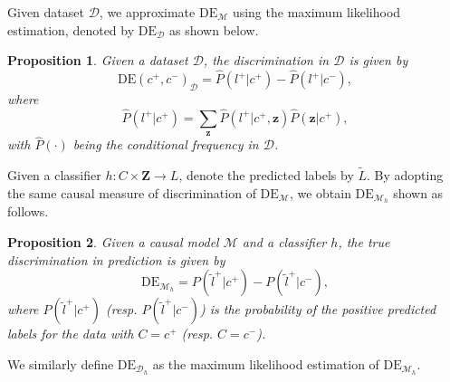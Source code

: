 \documentclass{article}
\newtheorem{proposition}{Proposition}
\begin{document}
Given dataset $\mathcal{D}$, we approximate $\mathrm{DE}_{\mathcal{M}}$ using the maximum likelihood estimation, denoted by $\mathrm{DE}_{\mathcal{D}}$ as shown below.


\begin{proposition}\label{thm:define_ded}
Given a dataset $\mathcal{D}$, the discrimination in $\mathcal{D}$ is given by
\begin{equation*}
\mathrm{DE}(c^{+},c^{-})_{\mathcal{D}} = \hat{P}(l^{+}|c^{+}) - \hat{P}(l^{+}|c^{-}),
\end{equation*}
where
\begin{equation}\label{eq:plc}
\hat{P}(l^{+}|c^{+}) = \sum_{\mathbf{z}}\hat{P}(l^{+}|c^{+},\mathbf{z})\hat{P}(\mathbf{z}|c^{+}),
\end{equation}
with $\hat{P}(\cdot)$ being the conditional frequency in $\mathcal{D}$.
\end{proposition}

Given a classifier $h: C\times \mathbf{Z} \rightarrow L$, denote the predicted labels by $\tilde{L}$. By adopting the same causal measure of discrimination of $\mathrm{DE}_{\mathcal{M}}$, we obtain $\mathrm{DE}_{\mathcal{M}_{h}}$ shown as follows.

\begin{proposition}\label{thm:compute_mh}
Given a causal model $\mathcal{M}$ and a classifier $h$, the true discrimination in prediction is given by
\begin{equation*}
\mathrm{DE}_{\mathcal{M}_{h}} = P(\tilde{l}^{+}|c^{+}) - P(\tilde{l}^{+}|c^{-}),
\end{equation*}
where $P(\tilde{l}^{+}|c^{+})$ (resp. $P(\tilde{l}^{+}|c^{-})$) is the probability of the positive predicted labels for the data with $C=c^{+}$ (resp. $C=c^{-}$). %
\end{proposition} 

We similarly define $\mathrm{DE}_{\mathcal{D}_{h}}$ as the maximum likelihood estimation of $\mathrm{DE}_{\mathcal{M}_{h}}$.
\end{document}

